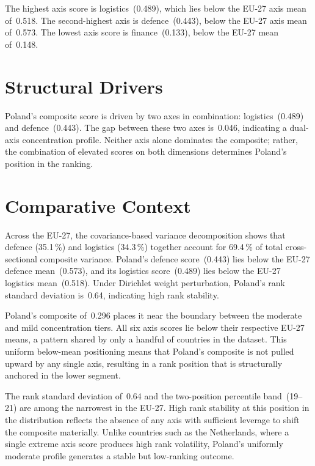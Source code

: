 \documentclass[12pt,a4paper]{article}
\begin{document}
The highest axis score is logistics~(0.489), which lies below the EU-27 axis mean of~0.518.  The second-highest axis is defence~(0.443), below the EU-27 axis mean of~0.573.  The lowest axis score is finance~(0.133), below the EU-27 mean of~0.148.


\section{Structural Drivers}
\label{sec:drivers}

\begin{sloppypar}
Poland's composite score is driven by two axes in combination: logistics~(0.489) and defence~(0.443).  The gap between these two axes is~0.046, indicating a dual-axis concentration profile.  Neither axis alone dominates the composite; rather, the combination of elevated scores on both dimensions determines Poland's position in the ranking.
\end{sloppypar}


\section{Comparative Context}
\label{sec:comparative}

Across the EU-27, the covariance-based variance decomposition shows that defence (35.1\,\%) and logistics (34.3\,\%) together account for 69.4\,\% of total cross-sectional composite variance.  Poland's defence score~(0.443) lies below the EU-27 defence mean~(0.573), and its logistics score~(0.489) lies below the EU-27 logistics mean~(0.518).  Under Dirichlet weight perturbation, Poland's rank standard deviation is~0.64, indicating high rank stability.



Poland's composite of~0.296 places it near the boundary between the moderate and mild concentration tiers.  All six axis scores lie below their respective EU-27 means, a pattern shared by only a handful of countries in the dataset.  This uniform below-mean positioning means that Poland's composite is not pulled upward by any single axis, resulting in a rank position that is structurally anchored in the lower segment.

The rank standard deviation of~0.64 and the two-position percentile band~(19--21) are among the narrowest in the EU-27.  High rank stability at this position in the distribution reflects the absence of any axis with sufficient leverage to shift the composite materially.  Unlike countries such as the Netherlands, where a single extreme axis score produces high rank volatility, Poland's uniformly moderate profile generates a stable but low-ranking outcome.
\end{document}

